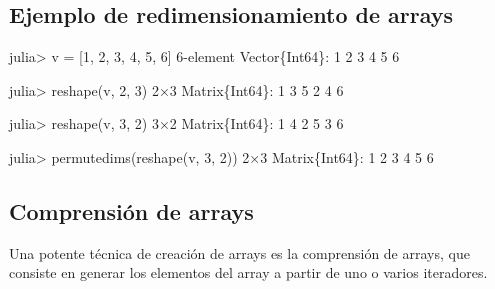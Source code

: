 \documentclass[
  letterpaper,
  DIV=11,
  numbers=noendperiod]{scrreprt}
\newenvironment{Shaded}{\begin{snugshade}}{\end{snugshade}}
\newcommand{\DataTypeTok}[1]{\textcolor[rgb]{0.68,0.00,0.00}{#1}}
\newcommand{\FloatTok}[1]{\textcolor[rgb]{0.68,0.00,0.00}{#1}}
\newcommand{\FunctionTok}[1]{\textcolor[rgb]{0.28,0.35,0.67}{#1}}
\newcommand{\NormalTok}[1]{\textcolor[rgb]{0.00,0.23,0.31}{#1}}
\newcommand{\OperatorTok}[1]{\textcolor[rgb]{0.37,0.37,0.37}{#1}}
\begin{document}
\hypertarget{ejemplo-de-redimensionamiento-de-arrays}{%
\subsection{Ejemplo de redimensionamiento de
arrays}\label{ejemplo-de-redimensionamiento-de-arrays}}

\begin{Shaded}
\begin{Highlighting}[]
\NormalTok{julia}\OperatorTok{\textgreater{}}\NormalTok{ v }\OperatorTok{=}\NormalTok{ [}\FloatTok{1}\NormalTok{, }\FloatTok{2}\NormalTok{, }\FloatTok{3}\NormalTok{, }\FloatTok{4}\NormalTok{, }\FloatTok{5}\NormalTok{, }\FloatTok{6}\NormalTok{]}
\FloatTok{6}\OperatorTok{{-}}\NormalTok{element }\DataTypeTok{Vector}\NormalTok{\{}\DataTypeTok{Int64}\NormalTok{\}}\OperatorTok{:}
 \FloatTok{1}
 \FloatTok{2}
 \FloatTok{3}
 \FloatTok{4}
 \FloatTok{5}
 \FloatTok{6}

\NormalTok{julia}\OperatorTok{\textgreater{}} \FunctionTok{reshape}\NormalTok{(v, }\FloatTok{2}\NormalTok{, }\FloatTok{3}\NormalTok{)}
\FloatTok{2}\OperatorTok{×}\FloatTok{3} \DataTypeTok{Matrix}\NormalTok{\{}\DataTypeTok{Int64}\NormalTok{\}}\OperatorTok{:}
 \FloatTok{1}  \FloatTok{3}  \FloatTok{5}
 \FloatTok{2}  \FloatTok{4}  \FloatTok{6}

\NormalTok{julia}\OperatorTok{\textgreater{}} \FunctionTok{reshape}\NormalTok{(v, }\FloatTok{3}\NormalTok{, }\FloatTok{2}\NormalTok{)}
\FloatTok{3}\OperatorTok{×}\FloatTok{2} \DataTypeTok{Matrix}\NormalTok{\{}\DataTypeTok{Int64}\NormalTok{\}}\OperatorTok{:}
 \FloatTok{1}  \FloatTok{4}
 \FloatTok{2}  \FloatTok{5}
 \FloatTok{3}  \FloatTok{6}

\NormalTok{julia}\OperatorTok{\textgreater{}} \FunctionTok{permutedims}\NormalTok{(}\FunctionTok{reshape}\NormalTok{(v, }\FloatTok{3}\NormalTok{, }\FloatTok{2}\NormalTok{))}
\FloatTok{2}\OperatorTok{×}\FloatTok{3} \DataTypeTok{Matrix}\NormalTok{\{}\DataTypeTok{Int64}\NormalTok{\}}\OperatorTok{:}
 \FloatTok{1}  \FloatTok{2}  \FloatTok{3}
 \FloatTok{4}  \FloatTok{5}  \FloatTok{6}
\end{Highlighting}
\end{Shaded}

\hypertarget{comprensiuxf3n-de-arrays}{%
\subsection{Comprensión de arrays}\label{comprensiuxf3n-de-arrays}}

Una potente técnica de creación de arrays es la comprensión de arrays,
que consiste en generar los elementos del array a partir de uno o varios
iteradores.
\end{document}
